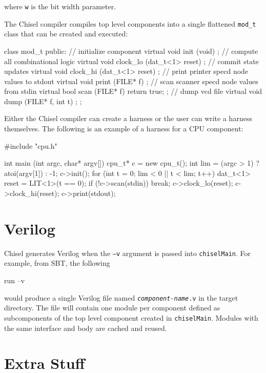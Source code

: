 \documentclass[10pt,twocolumn]{article}
\def\code#1{{\small\tt #1}}
\begin{document}
\noindent
where \code{w} is the bit width parameter.

The Chisel compiler compiles top level components into a single flattened \code{mod\_t}
class that can be created and executed:

\begin{cpp}
class mod_t {
 public:
  // initialize component
  virtual void init (void) { };
  // compute all combinational logic
  virtual void clock_lo (dat_t<1> reset) { };
  // commit state updates
  virtual void clock_hi (dat_t<1> reset) { };
  // print printer specd node values to stdout
  virtual void print (FILE* f) { };
  // scan scanner specd node values from stdin
  virtual bool scan (FILE* f) { return true; };
  // dump vcd file
  virtual void dump (FILE* f, int t) { };
};
\end{cpp}

Either the Chisel compiler can create a harness or the user can write
a harness themselves.  The following is an example of a harness for a
CPU component:

\begin{cpp}
#include "cpu.h"

int main (int argc, char* argv[]) {
  cpu_t* c = new cpu_t();
  int lim = (argc > 1) ? atoi(argv[1]) : -1;
  c->init();
  for (int t = 0; lim < 0 || t < lim; t++) {
    dat_t<1> reset = LIT<1>(t == 0);
    if (!c->scan(stdin)) break;
    c->clock_lo(reset);
    c->clock_hi(reset);
    c->print(stdout);
  }
}
\end{cpp}

\section{Verilog}

Chisel generates Verilog when the \code{--v} argument is passed into
\code{chiselMain}.  For example, from SBT, the following

\begin{scala}
run --v
\end{scala}

\noindent
would produce a single Verilog file named \code{{\it component-name}.v} in
the target directory.
The file will contain one module per component defined as subcomponents of
the top level component created in \code{chiselMain}.  Modules with
the same interface and body are cached and reused.

\section{Extra Stuff}
\end{document}
